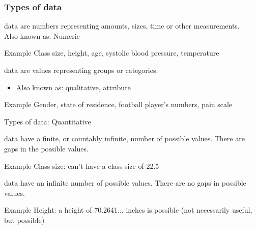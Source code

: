 \documentclass[xcolor=table, handout]{beamer}
\begin{document}
\begin{frame}
\frametitle{Types of data}

\begin{block}{}
\large {} data are numbers representing amounts, sizes, time or other measurements.\\
Also known as: Numeric
\end{block}

\begin{exampleblock}{Example}
Class size, height, age, systolic blood pressure, temperature
\end{exampleblock}

\pause

\begin{block}{}
\large {} data are values representing groups or categories.
\begin{itemize}
\item Also known as: qualitative, attribute
\end{itemize}
\end{block}

\begin{exampleblock}{Example}
Gender, state of residence, football player's numbers, pain scale
\end{exampleblock}

\end{frame}

\begin{frame}{Types of data: Quantitative}
\begin{block}{}
\large {} data have a finite, or countably infinite, number of possible values. There are gaps in the possible values.
\end{block}

\begin{exampleblock}{Example}
Class size: can't have a class size of 22.5
\end{exampleblock}
\pause
\begin{block}{}
\large {} data have an infinite number of possible values. There are no gaps in possible values.
\end{block}

\begin{exampleblock}{Example}
Height: a height of 70.2641... inches is possible (not necessarily useful, but possible)
\end{exampleblock}

\end{frame}
\end{document}

